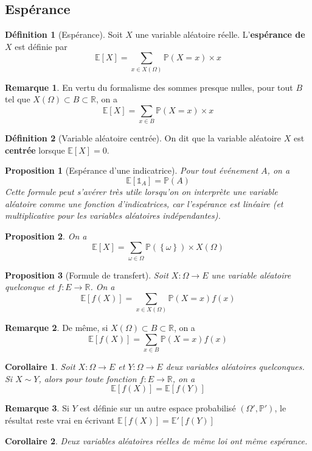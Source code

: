 \documentclass[french]{book}
\renewcommand{\P}{\mathbb{P}}
\newcommand{\R}{\mathbb{R}}
\newcommand{\E}{\mathbb{E}}
\theoremstyle{plain}
\newtheorem{prop}{Proposition}[chapter]
\newtheorem{cor}{Corollaire}[chapter]
\theoremstyle{definition}
\newtheorem{dfn}{Définition}[chapter]
\newtheorem{rmq}{Remarque}[chapter]
\theoremstyle{remark}
\begin{document}
\subsection{Espérance}
\begin{dfn}[Espérance]
	Soit $X$ une variable aléatoire réelle. L'\textbf{espérance de $X$} est définie par $$\E[X]=\sum_{x\in X(\Omega)}\P(X=x)\times x$$ 
\end{dfn}
\begin{rmq} En vertu du formalisme des sommes presque nulles, pour tout $B$ tel que $X(\Omega)\subset B\subset\R$, on a $$\E[X]=\sum_{x\in B}\P(X=x)\times x$$ \end{rmq}
\begin{dfn}[Variable aléatoire centrée]
	On dit que la variable aléatoire $X$ est \textbf{centrée} lorsque $\E[X]=0$.
\end{dfn}
\begin{prop}[Espérance d'une indicatrice]
	Pour tout événement $A$, on a $$\E[\mathds{1}_A]=\P(A)$$ Cette formule peut s'avérer très utile lorsqu'on on interprète une variable aléatoire comme une fonction d'indicatrices, car l'espérance est linéaire (et multiplicative pour les variables aléatoires indépendantes).
\end{prop}
\begin{prop}
	On a $$\E[X]=\sum_{\omega\in\Omega}\P(\left\{\omega\right\})\times X(\Omega)$$
\end{prop}
\begin{prop}[Formule de transfert]
	Soit $X:\Omega\rightarrow E$ une variable aléatoire quelconque et $f:E\rightarrow\R$. On a $$\E[f(X)]=\sum_{x\in X(\Omega)}\P(X=x)f(x)$$
\end{prop}
\begin{rmq} De même, si $X(\Omega)\subset B\subset\R$, on a $$\E[f(X)]=\sum_{x\in B}\P(X=x)f(x)$$ \end{rmq}
\begin{cor}
	Soit $X:\Omega\rightarrow E$ et $Y:\Omega\rightarrow E$ deux variables aléatoires quelconques. Si $X\sim Y$, alors pour toute fonction $f:E\rightarrow\R$, on a $$\E[f(X)]=\E[f(Y)]$$
\end{cor}
\begin{rmq} Si $Y$ est définie sur un autre espace probabilisé $(\Omega',\P')$, le résultat reste vrai en écrivant $\E[f(X)]=\E'[f(Y)]$ \end{rmq}
\begin{cor}
	Deux variables aléatoires réelles de même loi ont même espérance.
\end{cor}
\end{document}
